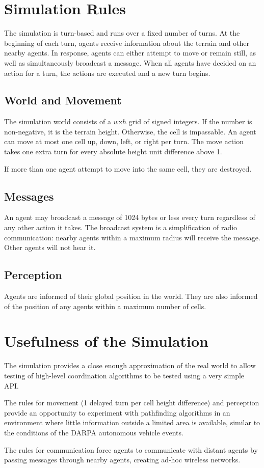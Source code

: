 \section{Simulation Rules}
\label{rules}

The simulation is turn-based and runs over a fixed number of turns. At the beginning of each turn, agents receive information about the terrain and other nearby agents. In response, agents can either attempt to move or remain still, as well as simultaneously broadcast a message. When all agents have decided on an action for a turn, the actions are executed and a new turn begins.

\subsection{World and Movement}

The simulation world consists of a $w$x$h$ grid of signed integers. If the number is non-negative, it is the terrain height. Otherwise, the cell is impassable. An agent can move at most one cell up, down, left, or right per turn. The move action takes one extra turn for every absolute height unit difference above 1.

If more than one agent attempt to move into the same cell, they are destroyed.

\subsection{Messages}

An agent may broadcast a message of 1024 bytes or less every turn regardless of any other action it takes. The broadcast system is a simplification of radio communication: nearby agents within a maximum radius will receive the message. Other agents will not hear it.

\subsection{Perception}

Agents are informed of their global position in the world. They are also informed of the position of any agents within a maximum number of cells.

\section{Usefulness of the Simulation}

The simulation provides a close enough approximation of the real world to allow testing of high-level coordination algorithms to be tested using a very simple API.

The rules for movement (1 delayed turn per cell height difference) and perception provide an opportunity to experiment with pathfinding algorithms in an environment where little information outside a limited area is available, similar to the conditions of the DARPA autonomous vehicle events.

The rules for communication force agents to communicate with distant agents by passing messages through nearby agents, creating ad-hoc wireless networks.
